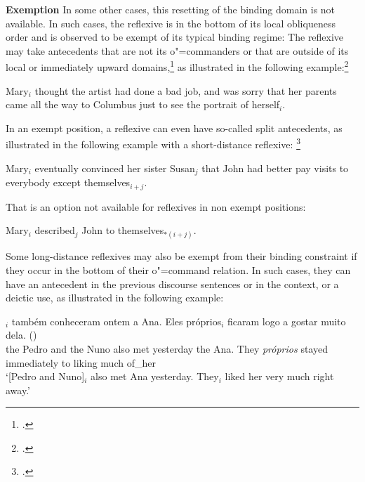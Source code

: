 \documentclass[output=paper
,modfonts
,nonflat]{langsci/langscibook}
\begin{document}
%


\textbf{Exemption} In some other cases, this resetting of the binding domain is not 
available. In such cases, the reflexive is in the bottom of its local obliqueness
order and is observed to be exempt of its typical binding regime: The reflexive may take antecedents 
that are not its o"=commanders or that are
outside of its local or immediately upward domains,\footnote{
\citep[p.263]{polsag:hpsg94}.}
as illustrated in the following example:\footnote{
\citep[p.73]{golde:diss99}.
}


\begin{exe}
\ex Mary$_{i}$ thought the artist had done a bad job, and was sorry
that her parents
came all the way to Columbus just to see the portrait of herself$_{i}$.
\end{exe}



In an exempt position, a reflexive can even have so-called
split antecedents, as illustrated in the following example
with a short-distance reflexive:%
%
\footnote{
\citep[p.42]{zribi:pview89}. 

}
%

\begin{exe}
\ex Mary$_{i}$ eventually convinced her sister Susan$_{j}$ that John had better 
pay visits to everybody except themselves$_{i+j}$.
\end{exe}

That is an option not available for reflexives in non exempt positions:

\begin{exe}
\ex Mary$_{i}$ described$_{j}$ John to themselves$_{*(i+j)}$.
\end{exe}


Some long-distance reflexives may also be exempt from their binding constraint if
they occur in the bottom of their o"=command relation. In such cases, they
can have an antecedent in the previous discourse sentences or
in the context, or a deictic use, as illustrated in the following example:


\begin{exe}
\ex
{}$_{i}$ tamb\'{e}m conheceram ontem a Ana. Eles pr\'{o}prios$_{i}$
ficaram logo a gostar muito dela. ()\\ 
the Pedro and the Nuno also met yesterday the Ana. They \emph{pr\'{o}prios} stayed immediately to
liking much of\_her\\
\trans `[Pedro and Nuno]$_{i}$ also met Ana yesterday. They$_{i}$ liked her very much right
away.'
\end{exe}
\end{document}
